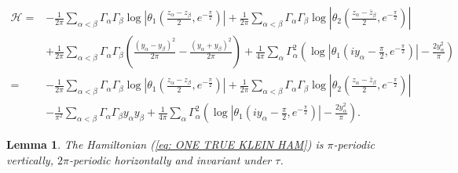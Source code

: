 \documentclass[11pt,twoside]{article}
\newtheorem{lem}[theorem]{Lemma}
\theoremstyle{definition}
\numberwithin{equation}{section}
\begin{document}
\begin{small}
\begin{equation}
\begin{split}
    \label{eq: ONE TRUE KLEIN HAM}
    \mathcal{H} =& -\frac{1}{2\pi}\sum\limits_{\alpha<\beta}\Gamma_{\alpha}\Gamma_{\beta}\log\left|\theta_1\left(\frac{z_{\alpha}-z_{\beta}}{2},e^{-\frac{\pi}{2}}\right)\right| + \frac{1}{2\pi}\sum\limits_{\alpha<\beta}\Gamma_{\alpha}\Gamma_{\beta}\log\left|\theta_2\left(\frac{z_{\alpha}-\bar{z}_{\beta}}{2},e^{-\frac{\pi}{2}}\right)\right|  \\&+\frac{1}{2\pi}\sum\limits_{\alpha<\beta}\Gamma_{\alpha}\Gamma_{\beta}\left(\frac{(y_{\alpha} - y_{\beta})^2}{2\pi} - \frac{(y_{\alpha} + y_{\beta})^2}{2\pi}\right) + \frac{1}{4\pi}\sum\limits_{\alpha}\Gamma_{\alpha}^2\left(\log\left|\theta_1\left(iy_{\alpha} - \frac{\pi}{2},e^{-\frac{\pi}{2}}\right)\right| - \frac{2y_{\alpha}^2}{\pi}\right)  \\=&
    -\frac{1}{2\pi}\sum\limits_{\alpha<\beta}\Gamma_{\alpha}\Gamma_{\beta}\log\left|\theta_1\left(\frac{z_{\alpha}-z_{\beta}}{2},e^{-\frac{\pi}{2}}\right)\right| + \frac{1}{2\pi}\sum\limits_{\alpha<\beta}\Gamma_{\alpha}\Gamma_{\beta}\log\left|\theta_2\left(\frac{z_{\alpha}-\bar{z}_{\beta}}{2},e^{-\frac{\pi}{2}}\right)\right| \\&-\frac{1}{\pi^2}\sum\limits_{\alpha<\beta}\Gamma_{\alpha}\Gamma_{\beta}y_{\alpha}y_{\beta} + \frac{1}{4\pi}\sum\limits_{\alpha}\Gamma_{\alpha}^2\left(\log\left|\theta_1\left(iy_{\alpha} - \frac{\pi}{2},e^{-\frac{\pi}{2}}\right)\right| - \frac{2y_{\alpha}^2}{\pi}\right).     \end{split}
\end{equation}
\end{small}

\begin{lem}
The Hamiltonian (\ref{eq: ONE TRUE KLEIN HAM}) is $\pi$-periodic vertically, $2\pi$-periodic horizontally and invariant under $\tau$. 
\end{lem}
\end{document}
